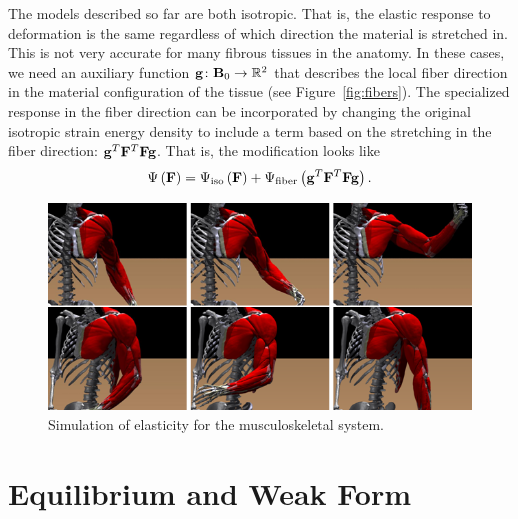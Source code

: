 The models described so far are both isotropic. That is, the elastic response to deformation is the same regardless of which direction the material is stretched in. This is not very accurate for many fibrous tissues in the anatomy. In these cases, we need an auxiliary function $\mathbf{g} \colon \mathbf{B}_0 \to \mathbb{R}^2$ that describes the local fiber direction in the material configuration of the tissue (see Figure~\ref{fig:fibers}). The specialized response in the fiber direction can be incorporated by changing the original isotropic strain energy density to include a term based on the stretching in the fiber direction: $\mathbf{g}^T \mathbf{F}^T \mathbf{F} \mathbf{g}$. That is, the modification looks like
\begin{equation*}
\Psi \left( \mathbf{F} \right) = \Psi_{\text{iso}} \left( \mathbf{F} \right) + \Psi_{\text{fiber}} \left( \mathbf{g}^T \mathbf{F}^T \mathbf{F} \mathbf{g} \right).
\end{equation*}

\begin{figure}
\includegraphics[width=\columnwidth]{images/muscles}
\caption{Simulation of elasticity for the musculoskeletal system.}
\end{figure}

\section*{Equilibrium and Weak Form}

